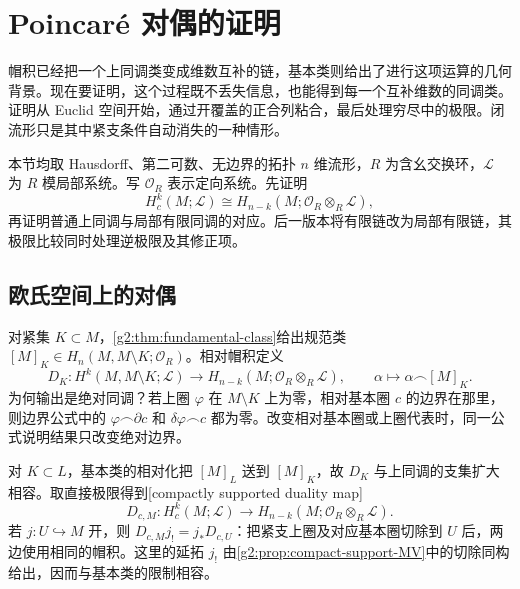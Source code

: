 
% 
% 

\section{Poincaré 对偶的证明}
\label{g2:sec:0603}

帽积已经把一个上同调类变成维数互补的链，基本类则给出了进行这项运算的几何背景。现在要证明，这个过程既不丢失信息，也能得到每一个互补维数的同调类。证明从 Euclid 空间开始，通过开覆盖的正合列粘合，最后处理穷尽中的极限。闭流形只是其中紧支条件自动消失的一种情形。

\ProseParagraphBreak

本节均取 Hausdorff、第二可数、无边界的拓扑 \(n\) 维流形，\(R\) 为含幺交换环，\(\mathcal L\) 为 \(R\) 模局部系统。写 \(\mathcal O_R\) 表示定向系统。先证明
\[
	H_c^k(M;\mathcal L)\cong H_{n-k}(M;\mathcal O_R\otimes_R\mathcal L),
\]
再证明普通上同调与局部有限同调的对应。后一版本将有限链改为局部有限链，其极限比较同时处理逆极限及其修正项。

\subsection{欧氏空间上的对偶}
\label{g2:subsec:0603:01}
对紧集 \(K\subset M\)，\cref{g2:thm:fundamental-class}给出规范类 \([M]_K\in H_n(M,M\setminus K;\mathcal O_R)\)。相对帽积定义
\[
	D_K:H^k(M,M\setminus K;\mathcal L)\longrightarrow H_{n-k}(M;\mathcal O_R\otimes_R\mathcal L),
	\qquad \alpha\longmapsto\alpha\frown[M]_K.
\]
为何输出是绝对同调？若上圈 \(\varphi\) 在 \(M\setminus K\) 上为零，相对基本圈 \(c\) 的边界在那里，则边界公式中的 \(\varphi\frown\partial c\) 和 \(\delta\varphi\frown c\) 都为零。改变相对基本圈或上圈代表时，同一公式说明结果只改变绝对边界。

\ProseParagraphBreak

对 \(K\subset L\)，基本类的相对化把 \([M]_L\) 送到 \([M]_K\)，故 \(D_K\) 与上同调的支集扩大相容。取直接极限得到[compactly supported duality map]
\begin{equation}\label{g2:eq:compact-duality-map}
	D_{c,M}:H_c^k(M;\mathcal L)\longrightarrow H_{n-k}(M;\mathcal O_R\otimes_R\mathcal L).
\end{equation}
若 \(j:U\hookrightarrow M\) 开，则 \(D_{c,M}j_!=j_*D_{c,U}\)：把紧支上圈及对应基本圈切除到 \(U\) 后，两边使用相同的帽积。这里的延拓 \(j_!\) 由\cref{g2:prop:compact-support-MV}中的切除同构给出，因而与基本类的限制相容。

